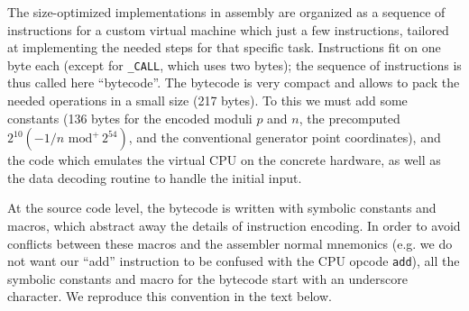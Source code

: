 \documentclass{llncs}
\newcommand{\umod}[2]{#1 \,\,\text{mod}^{+}\, #2}
\begin{document}
The size-optimized implementations in assembly are organized as a
sequence of instructions for a custom virtual machine which just a few
instructions, tailored at implementing the needed steps for that
specific task. Instructions fit on one byte each (except for
\verb+_CALL+, which uses two bytes); the sequence of instructions is
thus called here ``bytecode''. The bytecode is very compact and allows
to pack the needed operations in a small size (217 bytes). To this we
must add some constants (136 bytes for the encoded moduli $p$ and $n$,
the precomputed $2^{10}(\umod{-1/n}{2^{54}})$, and the conventional
generator point coordinates), and the code which emulates the virtual
CPU on the concrete hardware, as well as the data decoding routine to
handle the initial input.

At the source code level, the bytecode is written with symbolic
constants and macros, which abstract away the details of instruction
encoding. In order to avoid conflicts between these macros and the
assembler normal mnemonics (e.g. we do not want our ``add'' instruction
to be confused with the CPU opcode \verb+add+), all the symbolic
constants and macro for the bytecode start with an underscore character.
We reproduce this convention in the text below.
\end{document}
